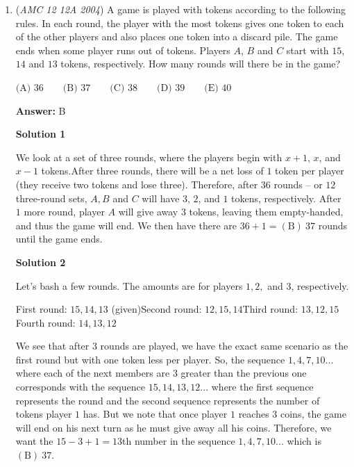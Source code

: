 \begin{enumerate}
 After comparison, $U-V$ is the largest. $\mathrm {(A)}$




\textbf{Solution 2}

A quick check reveals the positive integers are in decreasing order. Then note $V = 2004^{2005}$. $\newline$$U - V = 2004^{2005} = V$, and any of the other differences cannot be greater than or equal to $V$, hence choose $\boxed{A}$ as the answer.

 


	\item (\textit{AMC 12 12A 2004}) A game is played with tokens according to the following rules. In each round, the player with the most tokens gives one token to each of the other players and also places one token into a discard pile. The game ends when some player runs out of tokens. Players $A$, $B$ and $C$ start with $15$, $14$ and $13$ tokens, respectively. How many rounds will there be in the game? 


 $\text{(A) } 36 \qquad \text{(B) } 37 \qquad \text{(C) } 38 \qquad \text{(D) } 39 \qquad \text{(E) } 40 \qquad$

 \textbf{Answer: }B



\textbf{Solution 1}

We look at a set of three rounds, where the players begin with $x+1$, $x$, and $x-1$ tokens.After three rounds, there will be a net loss of $1$ token per player (they receive two tokens and lose three). Therefore, after $36$ rounds -- or $12$ three-round sets, $A,B$ and $C$ will have $3$, $2$, and $1$ tokens, respectively.  After $1$ more round, player $A$ will give away $3$ tokens, leaving them empty-handed, and thus the game will end. We then have there are $36+1=\boxed{\mathrm{(B)}\ 37}$ rounds until the game ends.

 



\textbf{Solution 2}

Let's bash a few rounds. The amounts are for players $1,2,$ and $3$, respectively.

 First round: $15,14,13$ (given)Second round: $12,15,14$Third round: $13,12,15$Fourth round: $14,13,12$

 We see that after $3$ rounds are played, we have the exact same scenario as the first round but with one token less per player. So, the sequence $1,4,7,10...$ where each of the next members are $3$ greater than the previous one corresponds with the sequence $15,14,13,12...$ where the first sequence represents the round and the second sequence represents the number of tokens player $1$ has. But we note that once player $1$ reaches $3$ coins, the game will end on his next turn as he must give away all his coins. Therefore, we want the $15-3+1=13$th number in the sequence $1,4,7,10...$ which is $\boxed{\mathrm{(B)}\ 37}$.


\end{enumerate}
